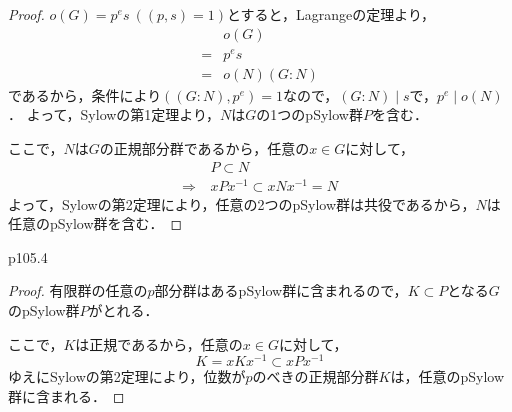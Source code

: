 \documentclass[dvipdfmx,uplatex,11pt]{jsarticle}
\theoremstyle{mytheorem}
\begin{document}
        \begin{leftbar}
            \begin{proof}
                $o (G)=p^e s~((p,s)=1)$とすると，Lagrangeの定理より，
                \begin{align*}
                    &o(G) \\
                    =& p^e s \\
                    =&o(N)(G:N)
                \end{align*}
                であるから，条件により$((G:N),p^e)=1$なので，$(G:N) \mid s$で，$p^e \mid o(N)$．
                よって，Sylowの第1定理より，$N$は$G$の1つのpSylow群$P$を含む．

                ここで，$N$は$G$の正規部分群であるから，任意の$x \in G$に対して，
                \begin{align*}
                    &P \subset N \\
                    \Longrightarrow ~& x P x^{-1} \subset x N x^{-1}=N
                \end{align*}
                よって，Sylowの第2定理により，任意の2つのpSylow群は共役であるから，$N$は任意のpSylow群を含む．
            \end{proof}
        \end{leftbar}
        p105.4
        \begin{leftbar}
            \begin{proof}
                有限群の任意の$p$部分群はあるpSylow群に含まれるので，$K \subset P$となる$G$のpSylow群$P$がとれる．

                ここで，$K$は正規であるから，任意の$x \in G$に対して，
                \[
                    K =x K x^{-1} \subset x P x^{-1}
                \]
                ゆえにSylowの第2定理により，位数が$p$のべきの正規部分群$K$は，任意のpSylow群に含まれる．
            \end{proof}
        \end{leftbar}
\end{document}
